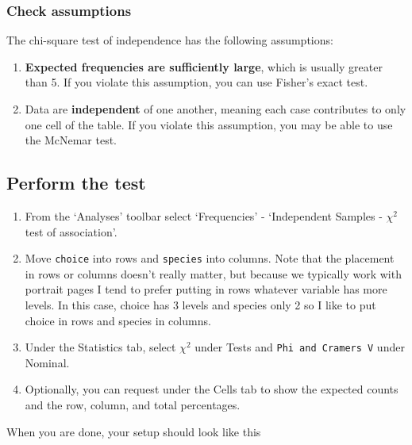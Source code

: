 \documentclass[
]{book}
\begin{document}
\hypertarget{check-assumptions-4}{%
\subsubsection{Check assumptions}\label{check-assumptions-4}}

The chi-square test of independence has the following assumptions:

\begin{enumerate}
\def\labelenumi{\arabic{enumi}.}
\item
  \textbf{Expected frequencies are sufficiently large}, which is usually greater than 5. If you violate this assumption, you can use Fisher's exact test.
\item
  Data are \textbf{independent} of one another, meaning each case contributes to only one cell of the table. If you violate this assumption, you may be able to use the McNemar test.
\end{enumerate}

\hypertarget{perform-the-test-4}{%
\subsection{Perform the test}\label{perform-the-test-4}}

\begin{enumerate}
\def\labelenumi{\arabic{enumi}.}
\item
  From the `Analyses' toolbar select `Frequencies' - `Independent Samples - \(\chi^2\) test of association'.
\item
  Move \texttt{choice} into rows and \texttt{species} into columns. Note that the placement in rows or columns doesn't really matter, but because we typically work with portrait pages I tend to prefer putting in rows whatever variable has more levels. In this case, choice has 3 levels and species only 2 so I like to put choice in rows and species in columns.
\item
  Under the Statistics tab, select \(\chi^2\) under Tests and \texttt{Phi\ and\ Cramer\textquotesingle{}s\ V} under Nominal.
\item
  Optionally, you can request under the Cells tab to show the expected counts and the row, column, and total percentages.
\end{enumerate}

When you are done, your setup should look like this
\end{document}
